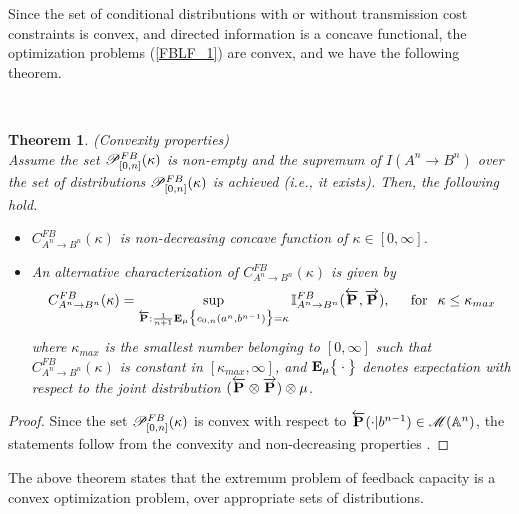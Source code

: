 \documentclass[11pt, a4paper, journal,onecolumn]{IEEEtran}
\newcommand{\rar}{\rightarrow}
\newcommand{\hso}{\hspace{.1in}}
\newcommand{\hst}{\hspace{.2in}}
\newtheorem{theorem}{Theorem}[section]
\begin{document}
Since the set of conditional distributions with or without  transmission cost constraints is convex, and directed information is a concave functional, the optimization problems (\ref{FBLF_1}) are convex, and  we have the following theorem.

\ \

\begin{theorem}(Convexity properties)\\
\label{thm-pr_fb}
Assume the set $ {\cal P}_{[0,n]}^{FB}(\kappa)$ is non-empty and  the supremum of $I(A^n \rar B^n)$  over the  set of distributions $ {\cal P}_{[0,n]}^{FB}(\kappa)$ is achieved (i.e., it exists). Then, the following hold.
\begin{itemize}
\item[(a)] $C_{A^n \rar B^n}^{FB}(\kappa)$ is non-decreasing  concave function of $\kappa \in [0, \infty]$.
\item[(b)] An alternative characterization of  $C_{A^n \rar B^n}^{FB}(\kappa)$ is given by
 \begin{align}
 C_{A^n \rar B^n}^{FB}(\kappa)=\sup_{\overleftarrow{\bf P}:  {\frac{1}{n{+}1}} {\bf  E}_\mu \big\{ c_{0,n}(a^n,b^{n{-}1}) \big\}  =  \kappa } {\mathbb I}_{A^n \rar B^n}^{FB}(\overleftarrow{\bf P}, \overrightarrow{\bf  P}),  \hst \mbox{for} \hso  \kappa \leq \kappa_{max} \label{extr_con_pro}
 \end{align}
where $\kappa_{max}$  is the smallest number belonging to $[0,\infty]$ such that $C_{A^n \rar B^n}^{FB}(\kappa)$ is constant in $[\kappa_{max}, \infty]$, and ${\bf E}_\mu\big\{\cdot \big\}$ denotes expectation with respect to the joint distribution $(\overleftarrow{ \bf P}\otimes \overrightarrow{\bf P})\otimes \mu$.
\end{itemize}  
\end{theorem}

\begin{proof} Since the set $ {\cal P}_{[0,n]}^{FB}(\kappa)$ is convex with respect to $\overleftarrow{ \bf P}(\cdot|b^{n-1})\in {\cal M}({\mathbb A^n})$, the statements follow from 
the convexity and non-decreasing properties \cite{charalambous-stavrou2012}.
\end{proof}

The above theorem states that the extremum problem of feedback capacity is a convex optimization problem, over appropriate sets of distributions.  \\
\end{document}
